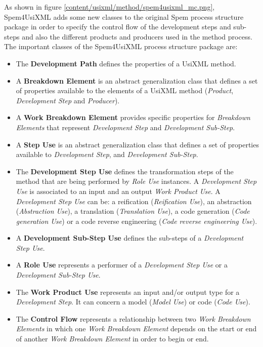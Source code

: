 As shown in figure \ref{content/usixml/method/spem4usixml_mc.png}, Spem4UsiXML adds some new classes to the original Spem process structure package in order to specify the control flow of the development steps and sub-steps and also the different products and producers used in the method process. The important classes of the Spem4UsiXML process structure package are:
\begin{itemize}

\item The \textbf{Development Path} defines the properties of a UsiXML method.
\item A \textbf{Breakdown Element} is an abstract generalization class that defines a set of properties available to the elements of a UsiXML method (\textit{Product}, \textit{Development Step} and \textit{Producer}).
\item A \textbf{Work Breakdown Element} provides specific properties for \textit{Breakdown Elements} that represent \textit{Development Step} and \textit{Development Sub-Step}.
\item A \textbf{Step Use} is an abstract generalization class that defines a set of properties available to \textit{Development Step}, and \textit{Development Sub-Step}.

\item The \textbf{Development Step Use} defines the transformation steps of the method that are being
performed by \textit{Role Use} instances. A \textit{Development Step Use} is associated to an input and an output \textit{Work Product Use}. A \textit{Development Step Use} can be: a reification (\textit{Reification Use}), an abstraction (\textit{Abstraction Use}), a translation (\textit{Translation Use}), a code generation (\textit{Code generation Use}) or a code reverse engineering (\textit{Code reverse engineering Use}).
\item A \textbf{Development Sub-Step Use} defines the sub-steps of a \textit{Development Step Use}.
\item A \textbf{Role Use} represents a performer of a \textit{Development Step Use} or a \textit{Development Sub-Step Use}.
\item The \textbf{Work Product Use} represents an input and/or output type for a \textit{Development Step}. It can concern a model (\textit{Model Use}) or code (\textit{Code Use}).
\item The \textbf{Control Flow} represents a relationship between two \textit{Work Breakdown Elements} in which one \textit{Work Breakdown Element} depends on the start or end of another \textit{Work Breakdown Element} in order to begin or end.
\end{itemize}